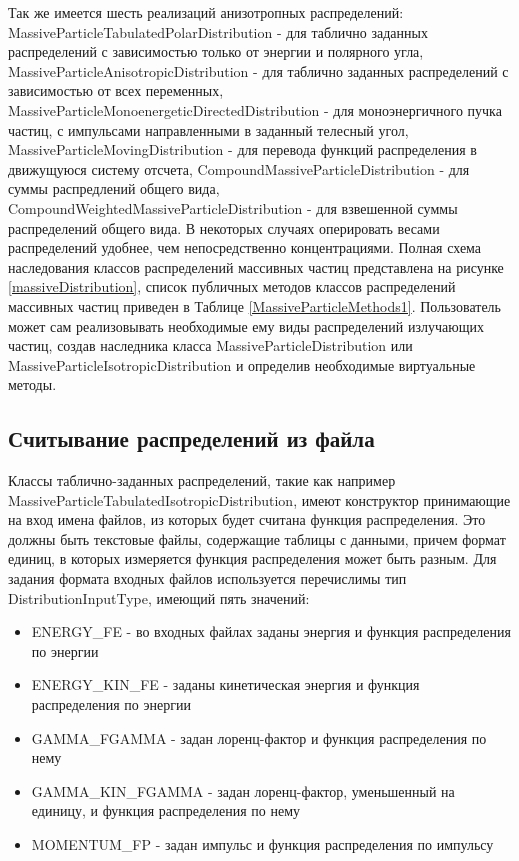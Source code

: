 Так же имеется шесть реализаций анизотропных распределений: MassiveParticleTabulatedPolarDistribution - для таблично заданных распределений с зависимостью только от энергии и полярного угла, MassiveParticleAnisotropicDistribution - для таблично заданных распределений с зависимостью от всех переменных, MassiveParticleMonoenergeticDirectedDistribution - для моноэнергичного пучка частиц, с импульсами направленными в заданный телесный угол, MassiveParticleMovingDistribution - для перевода функций распределения в движущуюся систему отсчета, CompoundMassiveParticleDistribution - для суммы распредлений общего вида, CompoundWeightedMassiveParticleDistribution - для взвешенной суммы распределений общего вида. В некоторых случаях оперировать весами распределений удобнее, чем непосредственно концентрациями. Полная схема наследования классов распределений массивных частиц представлена на рисунке \ref{massiveDistribution}, список публичных методов классов распределений массивных частиц приведен в Таблице \ref{MassiveParticleMethods1}. Пользователь может сам реализовывать необходимые ему виды распределений излучающих частиц, создав наследника класса MassiveParticleDistribution или MassiveParticleIsotropicDistribution и определив необходимые виртуальные методы.

\subsection{Считывание распределений из файла}
Классы таблично-заданных распределений, такие как например MassiveParticleTabulatedIsotropicDistribution, имеют конструктор принимающие на вход имена файлов, из которых будет считана функция распределения. Это должны быть текстовые файлы, содержащие таблицы с данными, причем формат единиц, в которых измеряется функция распределения может быть разным. Для задания формата входных файлов используется перечислимы тип DistributionInputType, имеющий пять значений:

\begin{itemize}
	\item ENERGY\_FE - во входных файлах заданы энергия и функция распределения по энергии
	\item ENERGY\_KIN\_FE - заданы кинетическая энергия и функция распределения по энергии
	\item GAMMA\_FGAMMA - задан лоренц-фактор и функция распределения по нему
	\item GAMMA\_KIN\_FGAMMA - задан лоренц-фактор, уменьшенный на единицу, и функция распределения по нему
	\item MOMENTUM\_FP - задан импульс и функция распределения по импульсу
\end{itemize}


